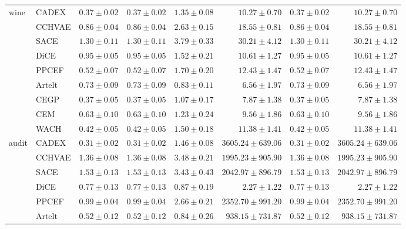\begin{table}[ht]
\begin{center}
\begin{sc}
\begin{scriptsize}
\begin{tabular}{l|l|rrrrrr}
\midrule
\multirow{9}{*}{wine} & CADEX & $\boldsymbol{0.37\pm{0.02}}$ & $\boldsymbol{0.37\pm{0.02}}$ & $1.35\pm{0.08}$ & $10.27\pm{0.70}$ & $\boldsymbol{0.37\pm{0.02}}$ & $10.27\pm{0.70}$ \\
 & CCHVAE & $0.86\pm{0.04}$ & $0.86\pm{0.04}$ & $2.63\pm{0.15}$ & $18.55\pm{0.81}$ & $0.86\pm{0.04}$ & $18.55\pm{0.81}$ \\
 & SACE & $1.30\pm{0.11}$ & $1.30\pm{0.11}$ & $3.79\pm{0.33}$ & $30.21\pm{4.12}$ & $1.30\pm{0.11}$ & $30.21\pm{4.12}$ \\
 & DiCE & $0.95\pm{0.05}$ & $0.95\pm{0.05}$ & $1.52\pm{0.21}$ & $10.61\pm{1.27}$ & $0.95\pm{0.05}$ & $10.61\pm{1.27}$ \\
 & PPCEF & $0.52\pm{0.07}$ & $0.52\pm{0.07}$ & $1.70\pm{0.20}$ & $12.43\pm{1.47}$ & $0.52\pm{0.07}$ & $12.43\pm{1.47}$ \\
 & Artelt & $0.73\pm{0.09}$ & $0.73\pm{0.09}$ & $\boldsymbol{0.83\pm{0.11}}$ & $\boldsymbol{6.56\pm{1.97}}$ & $0.73\pm{0.09}$ & $\boldsymbol{6.56\pm{1.97}}$ \\
 & CEGP & $\boldsymbol{0.37\pm{0.05}}$ & $\boldsymbol{0.37\pm{0.05}}$ & $1.07\pm{0.17}$ & $7.87\pm{1.38}$ & $\boldsymbol{0.37\pm{0.05}}$ & $7.87\pm{1.38}$ \\
 & CEM & $0.63\pm{0.10}$ & $0.63\pm{0.10}$ & $1.23\pm{0.24}$ & $9.56\pm{1.86}$ & $0.63\pm{0.10}$ & $9.56\pm{1.86}$ \\
 & WACH & $0.42\pm{0.05}$ & $0.42\pm{0.05}$ & $1.50\pm{0.18}$ & $11.38\pm{1.41}$ & $0.42\pm{0.05}$ & $11.38\pm{1.41}$ \\
\midrule
\multirow{9}{*}{audit} & CADEX & $0.31\pm{0.02}$ & $0.31\pm{0.02}$ & $1.46\pm{0.08}$ & $3605.24\pm{639.06}$ & $0.31\pm{0.02}$ & $3605.24\pm{639.06}$ \\
 & CCHVAE & $1.36\pm{0.08}$ & $1.36\pm{0.08}$ & $3.48\pm{0.21}$ & $1995.23\pm{905.90}$ & $1.36\pm{0.08}$ & $1995.23\pm{905.90}$ \\
 & SACE & $1.53\pm{0.13}$ & $1.53\pm{0.13}$ & $3.43\pm{0.43}$ & $2042.97\pm{896.79}$ & $1.53\pm{0.13}$ & $2042.97\pm{896.79}$ \\
 & DiCE & $0.77\pm{0.13}$ & $0.77\pm{0.13}$ & $0.87\pm{0.19}$ & $\boldsymbol{2.27\pm{1.22}}$ & $0.77\pm{0.13}$ & $\boldsymbol{2.27\pm{1.22}}$ \\
 & PPCEF & $0.99\pm{0.04}$ & $0.99\pm{0.04}$ & $2.66\pm{0.21}$ & $2352.70\pm{991.20}$ & $0.99\pm{0.04}$ & $2352.70\pm{991.20}$ \\
 & Artelt & $0.52\pm{0.12}$ & $0.52\pm{0.12}$ & $0.84\pm{0.26}$ & $938.15\pm{731.87}$ & $0.52\pm{0.12}$ & $938.15\pm{731.87}$ \\

\end{tabular}
\end{scriptsize}
\end{sc}
\end{center}
\end{table}
